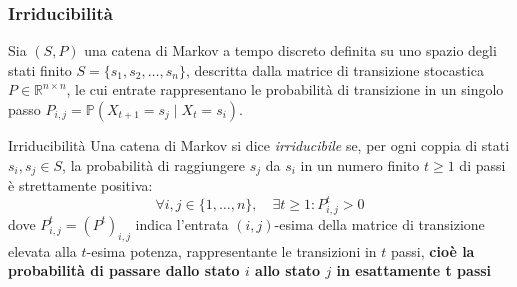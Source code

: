 \subsubsection{Irriducibilità}

Sia $(S, P)$ una catena di Markov a tempo discreto definita su uno spazio degli stati finito $S = \{s_1, s_2, \dots, s_n\}$, descritta dalla matrice di transizione stocastica $P \in \mathbb{R}^{n \times n}$, le cui entrate rappresentano le probabilità di transizione in un singolo passo $P_{i,j} = \mathbb{P}(X_{t+1} = s_j \mid X_t = s_i)$.

\begin{definition}{Irriducibilità}
Una catena di Markov si dice \emph{irriducibile} se, per ogni coppia di stati $s_i, s_j \in S$, la probabilità di raggiungere $s_j$ da $s_i$ in un numero finito $t \ge 1$ di passi è strettamente positiva:
\begin{equation*}
\forall i, j \in \{1, \dots, n\}, \quad \exists t \ge 1 : P_{i,j}^t > 0
\end{equation*}
dove $P_{i,j}^t = (P^t)_{i,j}$ indica l'entrata $(i,j)$-esima della matrice di transizione elevata alla $t$-esima potenza, rappresentante le transizioni in $t$ passi, \textbf{cioè la probabilità di passare dallo stato $i$ allo stato $j$ in esattamente t passi}
\end{definition}

